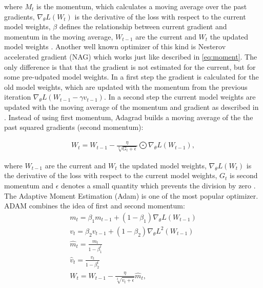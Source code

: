 where $M_{t}$ is the momentum, which calculates a moving average over the past gradients, $\nabla_{\theta}L(W_{t})$ is the derivative of the loss with respect to the current model weights, $\beta$ defines the relationship between current gradient and momentum in the moving average, $W_{t-1}$ are the current and $W_{t}$ the updated model weights \cite{Ruder2016}.\newline
\newline
Another well known optimizer of this kind is Nesterov accelerated gradient (NAG) which works just like described in  \ref{eq:moment}. The only difference is that that the gradient is not estimated for the current, but for some pre-udpated model weights. In a first step the gradient is calculated for the old model weights, which are updated with the momentum from the previous iteration $\nabla_{\theta}L( W_{t-1} - \gamma v_{t-1})$. In a second step the current model weights  are updated with the moving average of the momentum and gradient as described in \label{eq:moment} \cite{Ruder2016}.\newline
\newline
Instead of using first momentum, Adagrad builds a moving average of the the past squared gradients (second momentum):

\begin{equation}
  \begin{aligned}
  W_{t} = W_{t-1} - \frac{\eta}{\sqrt[2]{G_{t}+ \epsilon}} \bigodot \nabla_{\theta}L(W_{t-1}),
  \end{aligned}
  \label{eq:Adagrad}
\end{equation}

where  $W_{t-1}$ are the current and $W_{t}$ the updated model weights, $\nabla_{\theta}L(W_{t})$ is the derivative of the loss with respect to the current model weights, $G_{t}$ is second momentum and $\epsilon$ denotes a small quantity which prevents the division by zero  \cite{Ruder2016}.\newline
\newline
The Adaptive Moment Estimation (Adam) is one of the most popular optimizer. ADAM combines the idea of first and second momentum: 
\begin{equation}
  \begin{aligned}
   &m_{t} =  \beta_{1} m_{t-1} +  (1-\beta_{1}) \nabla_{\theta}L(W_{t-1}) &\\
    &v_{t} =  \beta_{2} v_{t-1} +  (1-\beta_{2}) \nabla_{\theta}L^{2}(W_{t-1}) &\\
    &\hat{m}_{t} = \frac{m_{t}}{1-\beta_{1}^{t}}&\\
    &\hat{v}_{t} = \frac{v_{t}}{1-\beta_{2}^{t}}&\\
   & W_{t} = W_{t-1} - \frac{\eta}{\sqrt[2]{\hat{v}_{t} + \epsilon}}\hat{m}_{t}, &\\
  \end{aligned}
  \label{eq:moment}
\end{equation}

